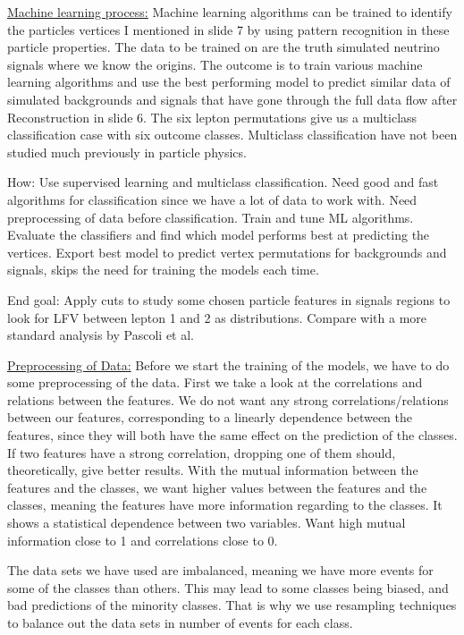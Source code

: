 \documentclass[a4paper, american, 12pt]{report}
\begin{document}
	
	\underline{Machine learning process:}
	Machine learning algorithms can be trained to identify the particles vertices I mentioned in slide 7 by using pattern recognition in these particle properties. The data to be trained on are the truth simulated neutrino signals where we know the origins. The outcome is to train various machine learning algorithms and use the best performing model to predict similar data of simulated backgrounds and signals that have gone through the full data flow after Reconstruction in slide 6. The six lepton permutations give us a multiclass classification case with six outcome classes. Multiclass classification have not been studied much previously in particle physics. 
	
	How: Use supervised learning and multiclass classification. Need good and fast algorithms for classification since we have a lot of data to work with. Need preprocessing of data before classification. Train and tune ML algorithms. Evaluate the classifiers and find which model performs best at predicting the vertices. Export best model to predict vertex permutations for backgrounds and signals, skips the need for training the models each time.
	
	End goal: Apply cuts to study some chosen particle features in signals regions to look for LFV between lepton 1 and 2 as distributions. Compare with a more standard analysis by Pascoli et al.
	
	
	\underline{Preprocessing of Data:}
	Before we start the training of the models, we have to do some preprocessing of the data. First we take a look at the correlations and relations between the features. We do not want any strong correlations/relations between our features, corresponding to a linearly dependence between the features, since they will both have the same effect on the prediction of the classes. If two features have a strong correlation, dropping one of them should, theoretically, give better results. 
	With the mutual information between the features and the classes, we want higher values between the features and the classes, meaning the features have more information regarding to the classes. It shows a statistical dependence between two variables. Want high mutual information close to 1 and correlations close to 0.
	
	The data sets we have used are imbalanced, meaning we have more events for some of the classes than others. This may lead to some classes being biased, and bad predictions of the minority classes. That is why we use resampling techniques to balance out the data sets in number of events for each class.
	
\end{document}
